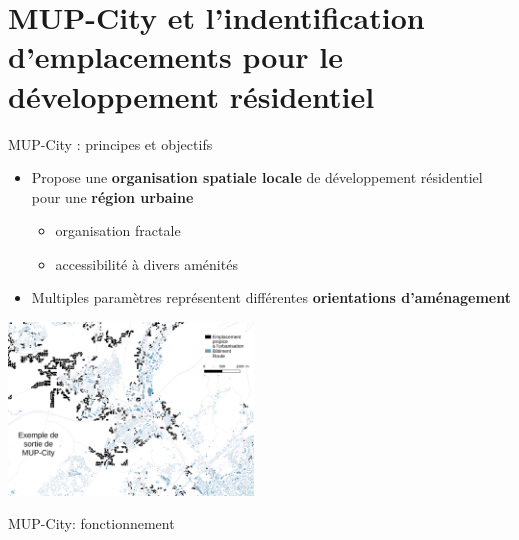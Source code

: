 \documentclass[xcolor=table]{beamer}
\begin{document}
\section[MUP-City]{MUP-City et l'indentification d'emplacements pour le développement résidentiel}


\begin{frame}{MUP-City : principes et objectifs}
	\\
	\begin{itemize}
		\item Propose une \textbf{organisation spatiale locale} de développement résidentiel pour une \textbf{région urbaine}
		\begin{itemize}
			\item<2-> organisation fractale
			\item<3-> accessibilité à divers aménités %
		\end{itemize}
		\item<4> Multiples paramètres représentent différentes \textbf{orientations d'aménagement}
	\end{itemize}
	\includegraphics[width=6.5cm]{Images/ex-sorties-mup.png}
\end{frame}

\begin{frame}{MUP-City: fonctionnement}
	\begin{block}{}\end{block}
\end{frame}
\end{document}
